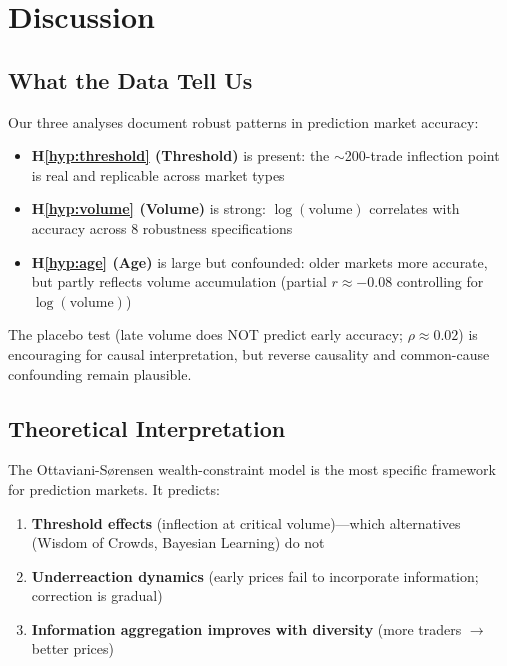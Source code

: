 \documentclass[a4paper,11pt]{article}
\theoremstyle{plain}
\theoremstyle{definition}
\theoremstyle{remark}
\begin{document}

\section{Discussion}
\label{sec:discussion}

\subsection{What the Data Tell Us}
\label{subsec:evidence}

Our three analyses document robust patterns in prediction market accuracy:

\begin{itemize}
    \item \textbf{H\ref{hyp:threshold} (Threshold)} is present: the $\sim$200-trade inflection point is real and replicable across market types
    \item \textbf{H\ref{hyp:volume} (Volume)} is strong: $\log(\text{volume})$ correlates with accuracy across 8 robustness specifications
    \item \textbf{H\ref{hyp:age} (Age)} is large but confounded: older markets more accurate, but partly reflects volume accumulation (partial $r \approx -0.08$ controlling for $\log(\text{volume})$)
\end{itemize}

The placebo test (late volume does NOT predict early accuracy; $\rho \approx 0.02$) is encouraging for causal interpretation, but reverse causality and common-cause confounding remain plausible.

\subsection{Theoretical Interpretation}
\label{subsec:theory_discuss}

The Ottaviani-Sørensen wealth-constraint model is the most specific framework for prediction markets. It predicts:

\begin{enumerate}
    \item \textbf{Threshold effects} (inflection at critical volume)---which alternatives (Wisdom of Crowds, Bayesian Learning) do not
    \item \textbf{Underreaction dynamics} (early prices fail to incorporate information; correction is gradual)
    \item \textbf{Information aggregation improves with diversity} (more traders $\to$ better prices)
\end{enumerate}
\end{document}
